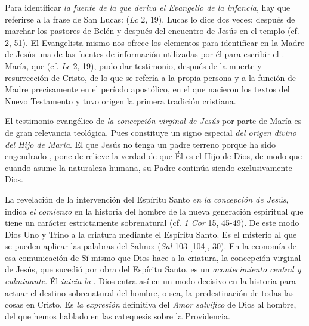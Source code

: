 \begin{body}
\begin{body}
Para identificar \emph{la fuente de la que deriva el Evangelio de la infancia}, hay que referirse a la frase de San Lucas:  (\emph{Lc} 2, 19). Lucas lo dice dos veces: después de marchar los pastores de Belén y después del encuentro de Jesús en el templo (cf. 2, 51). El Evangelista mismo nos ofrece los elementos para identificar en la Madre de Jesús una de las fuentes de información utilizadas por él para escribir el . María, que  (cf. \emph{Lc} 2, 19), pudo dar testimonio, después de la muerte y resurrección de Cristo, de lo que se refería a la propia persona y a la función de Madre precisamente en el período apostólico, en el que nacieron los textos del Nuevo Testamento y tuvo origen la primera tradición cristiana.

El testimonio evangélico de \emph{la concepción virginal de Jesús} por parte de María es de gran relevancia teológica. Pues constituye un signo especial \emph{del origen divino del Hijo de María}. El que Jesús no tenga un padre terreno porque ha sido engendrado , pone de relieve la verdad de que Él es el Hijo de Dios, de modo que cuando asume la naturaleza humana, su Padre continúa siendo exclusivamente Dios.

La revelación de la intervención del Espíritu Santo \emph{en la concepción de Jesús}, indica \emph{el comienzo} en la historia del hombre de la nueva generación espiritual que tiene un carácter estrictamente sobrenatural (cf. \emph{1 Cor} 15, 45-49). De este modo Dios Uno y Trino  a la criatura mediante el Espíritu Santo. Es el misterio al que se pueden aplicar las palabras del Salmo:  (\emph{Sal} 103 {[}104{]}, 30). En la economía de esa comunicación de Sí mismo que Dios hace a la criatura, la concepción virginal de Jesús, que sucedió por obra del Espíritu Santo, es un \emph{acontecimiento central y culminante}. Él \emph{inicia la }. Dios entra así en un modo decisivo en la historia para actuar el destino sobrenatural del hombre, o sea, la predestinación de todas las cosas en Cristo. Es \emph{la expresión} definitiva del \emph{Amor salvífico} de Dios al hombre, del que hemos hablado en las catequesis sobre la Providencia.


\end{body}
\end{body}
